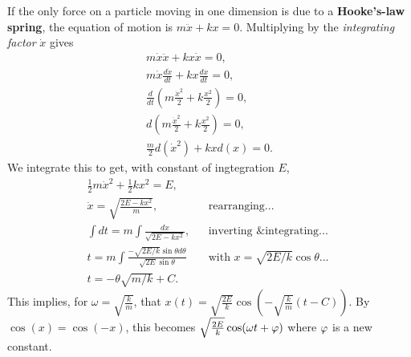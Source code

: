 \begin{remark}
    If the only force on a particle moving in one dimension is due to a \textbf{Hooke's-law spring}, the equation of motion is $m\ddot{x} + kx = 0$. Multiplying by the \emph{integrating factor} $\dot{x}$ gives 
    \begin{align*}
        m\dot{x}\ddot{x} + kx\dot{x} = 0, \\
        m\dot{x}\frac{d\dot{x}}{dt} + kx\frac{dx}{dt} = 0, \\
        \frac{d}{dt}(m\frac{\dot{x}^2}{2} + k\frac{x^2}{2}) = 0, \\
        d(m\frac{\dot{x}^2}{2} + k\frac{x^2}{2}) = 0, \\
        \frac{m}{2}d(\dot{x}^2) + kxd(x) = 0.
    \end{align*}
    We integrate this to get, with constant of ingtegration $E$,
    \begin{align*}
        \frac{1}{2}m\dot{x}^2 + \frac{1}{2}kx^2 = E, \\
        \dot{x} = \sqrt{\frac{2E - kx^2}{m}}, && \text{rearranging...} \\
        \int dt = m \int\frac{dx}{\sqrt{2E - kx^2}}, && \text{inverting \& integrating... } \\
        t = m \int\frac{-\sqrt{2E/k}\sin\theta d\theta}{\sqrt{2E}\sin\theta} && \text{with } x = \sqrt{2E/k}\cos\theta \text{...} \\
        t = -\theta\sqrt{m/k} + C.
    \end{align*}
    This implies, for $\omega = \sqrt{\frac{k}{m}}$, that $x(t) = \sqrt{\frac{2E}{k}}\cos(-\sqrt{\frac{k}{m}}(t-C))$. By $\cos(x) = \cos(-x)$, this becomes $\sqrt{\frac{2E}{k}}\cos(\omega t + \varphi)$ where $\varphi$ is a new constant.
\end{remark}
\begin{note}
    
\end{note}